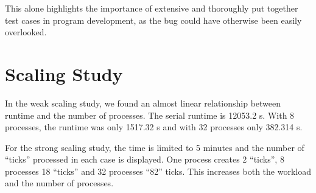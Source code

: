 \documentclass[11pt]{article}
\begin{document}
This alone highlights the importance of extensive and thoroughly put together test cases in program development, as the bug could have otherwise been easily overlooked.

\section{Scaling Study}
In the weak scaling study, we found an almost linear relationship between runtime and the number of processes. The serial runtime is 12053.2 s. With 8 processes, the runtime was only 1517.32 s and with 32 processes only 382.314 s.

For the strong scaling study, the time is limited to 5 minutes and the number of “ticks” processed in each case is displayed. One process creates 2 “ticks”, 8 processes 18 “ticks” and 32 processes “82” ticks. This increases both the workload and the number of processes. 

\end{document}

